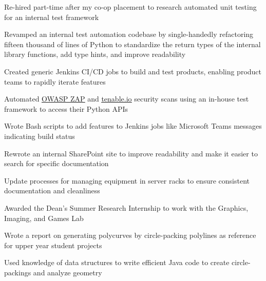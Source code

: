 \begin{bullets}
    \item Re-hired part-time after my co-op placement to research automated unit testing for an internal test framework
    \item Revamped an internal test automation codebase by single-handedly refactoring fifteen thousand of lines of Python to standardize the return types of the internal library functions, add type hints, and improve readability
    \item Created generic Jenkins CI/CD jobs to build and test products, enabling product teams to rapidly iterate features
    \item Automated \href{https://www.zaproxy.org/}{\underline{OWASP ZAP}} and \href{https://www.tenable.com/products/tenable-io}{\underline{tenable.io}} security scans using an in-house test framework to access their Python APIs
    \item Wrote Bash scripts to add features to Jenkins jobs like Microsoft Teams messages indicating build status
    \item Rewrote an internal SharePoint site to improve readability and make it easier to search for specific documentation
    \item Update processes for managing equipment in server racks to ensure consistent documentation and cleanliness
\end{bullets}

\hbox{}

\begin{bullets}
    \item Awarded the Dean's Summer Research Internship to work with the Graphics, Imaging, and Games Lab
    \item Wrote a report on generating polycurves by circle-packing polylines as reference for upper year student projects
    \item Used knowledge of data structures to write efficient Java code to create circle-packings and analyze geometry
\end{bullets}


